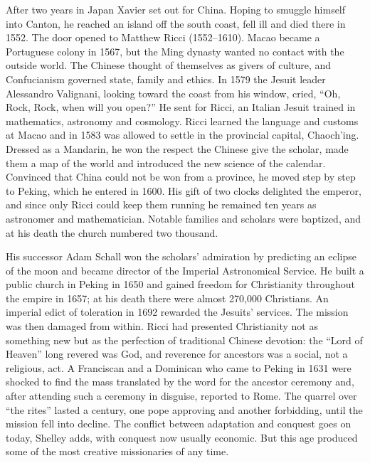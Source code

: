 After two years in Japan Xavier set out for China. Hoping to smuggle himself into Canton, he reached
an island off the south coast, fell ill and died there in 1552. The door opened to Matthew Ricci
(1552--1610). Macao became a Portuguese colony in 1567, but the Ming dynasty wanted no contact with
the outside world. The Chinese thought of themselves as givers of culture, and Confucianism governed
state, family and ethics. In 1579 the Jesuit leader Alessandro Valignani, looking toward the coast
from his window, cried, ``Oh, Rock, Rock, when will you open?'' He sent for Ricci, an Italian Jesuit
trained in mathematics, astronomy and cosmology. Ricci learned the language and customs at Macao and
in 1583 was allowed to settle in the provincial capital, Chaoch'ing. Dressed as a Mandarin, he won
the respect the Chinese give the scholar, made them a map of the world and introduced the new science
of the calendar. Convinced that China could not be won from a province, he moved step by step to
Peking, which he entered in 1600. His gift of two clocks delighted the emperor, and since only Ricci
could keep them running he remained ten years as astronomer and mathematician. Notable families and
scholars were baptized, and at his death the church numbered two thousand.

His successor Adam Schall won the scholars' admiration by predicting an eclipse of the moon and
became director of the Imperial Astronomical Service. He built a public church in Peking in 1650 and
gained freedom for Christianity throughout the empire in 1657; at his death there were almost 270,000
Christians. An imperial edict of toleration in 1692 rewarded the Jesuits' services. The mission was
then damaged from within. Ricci had presented Christianity not as something new but as the perfection
of traditional Chinese devotion: the ``Lord of Heaven'' long revered was God, and reverence for
ancestors was a social, not a religious, act. A Franciscan and a Dominican who came to Peking in 1631
were shocked to find the mass translated by the word for the ancestor ceremony and, after attending
such a ceremony in disguise, reported to Rome. The quarrel over ``the rites'' lasted a century, one
pope approving and another forbidding, until the mission fell into decline. The conflict between
adaptation and conquest goes on today, Shelley adds, with conquest now usually economic. But this age
produced some of the most creative missionaries of any time.

